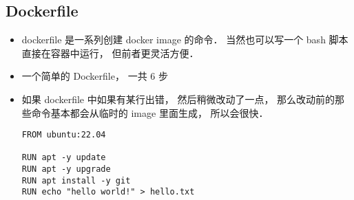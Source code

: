 \subsection{Dockerfile}
\begin{itemize}
\item dockerfile 是一系列创建 docker image 的命令． 当然也可以写一个 bash 脚本直接在容器中运行， 但前者更灵活方便．
\item 一个简单的 Dockerfile， 一共 6 步
\item 如果 dockerfile 中如果有某行出错， 然后稍微改动了一点， 那么改动前的那些命令基本都会从临时的 image 里面生成， 所以会很快．
\begin{lstlisting}[language=none]
FROM ubuntu:22.04

RUN apt -y update
RUN apt -y upgrade
RUN apt install -y git
RUN echo "hello world!" > hello.txt


\end{lstlisting}
\end{itemize}
